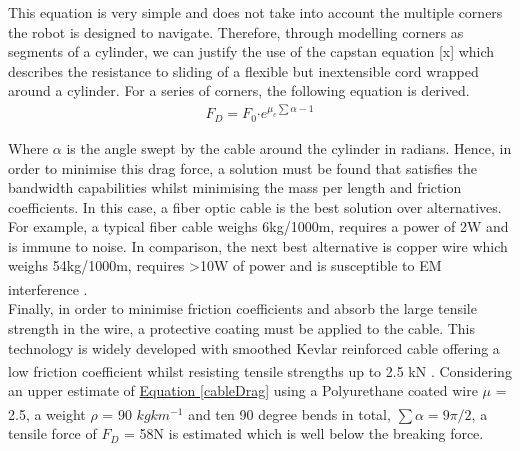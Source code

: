\documentclass[11pt]{article}		%
\newcommand{\supercite}[1]{\textsuperscript{\cite{#1}}}		%
\newcommand{\equationref}[1]{\hyperref[#1]{Equation \ref*{#1}}}     %
\begin{document}
	        This equation is very simple and does not take into account the multiple corners the robot is designed to navigate.
	        Therefore, through modelling corners as segments of a cylinder, we can justify the use of the capstan equation [x] which describes the resistance to sliding of a flexible but inextensible cord wrapped around a cylinder. 
	        For a series of corners, the following equation is derived.
	        \begin{align}
	                F_D = F_0 \boldsymbol{\cdot} {e}^{\mu_c \sum \alpha -1} \label{cableDrag}
	        \end{align}
	
			Where $\alpha$ is the angle swept by the cable around the cylinder in radians. 
		    Hence, in order to minimise this drag force, a solution must be found that satisfies the bandwidth capabilities whilst minimising the mass per length and friction coefficients.  
		    In this case, a fiber optic cable is the best solution over alternatives. 
		    For example, a typical fiber cable weighs 6kg/1000m, requires a power of 2W and is immune to noise. 
		    In comparison, the next best alternative is copper wire which weighs 54kg/1000m, requires >10W of power and is susceptible to EM interference \supercite{wiring}.
		    \\
	        Finally, in order to minimise friction coefficients and absorb the large tensile strength in the wire, a protective coating must be applied to the cable. 
		    This technology is widely developed with smoothed Kevlar reinforced cable offering a low friction coefficient whilst resisting tensile strengths up to 2.5 kN \supercite{macartney}. 
		    Considering an upper estimate of \equationref{cableDrag} using a Polyurethane coated wire $\mu$ = 2.5, a weight $\rho$ = 90 $kgkm^{-1}$ \supercite{macartney} and ten 90 degree bends in total, $\sum \alpha = 9\pi/2$, a tensile force of $F_D$ = 58N is estimated which is well below the breaking force.  
		    
\end{document}
